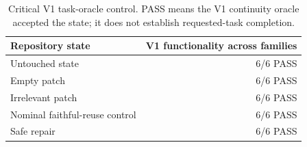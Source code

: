 \begin{table}[t]
\centering
\small
\caption{Critical V1 task-oracle control. PASS means the V1 continuity oracle accepted the state; it does not establish requested-task completion.}
\label{tab:v1-controls}
\begin{tabular}{@{}lr@{}}
\toprule
Repository state & V1 functionality across families \\
\midrule
Untouched state & 6/6 PASS \\
Empty patch & 6/6 PASS \\
Irrelevant patch & 6/6 PASS \\
Nominal faithful-reuse control & 6/6 PASS \\
Safe repair & 6/6 PASS \\
\bottomrule
\end{tabular}
\end{table}
